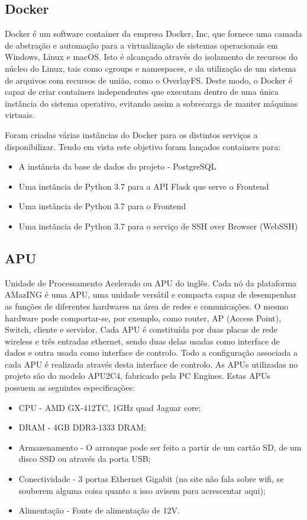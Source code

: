 \subsection{Docker}
Docker é um software container da empresa Docker, Inc, que fornece uma camada de abstração e automação para a virtualização de sistemas operacionais em Windows, Linux e macOS. Isto é alcançado através do isolamento de recursos do núcleo do Linux, tais como cgroups e namespaces, e da utilização de um sistema de arquivos com recursos de união, como o OverlayFS. Deste modo, o Docker é capaz de criar containers independentes que executam dentro de uma única instância do sistema operativo, evitando assim a sobrecarga de manter máquinas virtuais. 

Foram criadas várias instâncias do Docker para os distintos serviços a disponibilizar. Tendo em vista este objetivo foram lançados containers para:
\begin{itemize}
    \item A instância da base de dados do projeto - PostgreSQL
    \item Uma instância de Python 3.7 para a API Flask que serve o Frontend
    \item Uma instância de Python 3.7 para o Frontend
    \item Uma instância de Python 3.7 para o serviço de SSH over Browser (WebSSH)
\end{itemize}


\subsection{APU}
Unidade de Processamento Acelerado ou APU do inglês. Cada nó da plataforma AMazING é uma APU, uma unidade versátil e compacta capaz de desempenhar as funções de diferentes hardwares na área de redes e comunicações. O mesmo hardware pode comportar-se, por exemplo, como router, AP (Access Point), Switch, cliente e servidor.\newline
Cada APU é constituída por duas placas de rede wireless e três entradas ethernet, sendo duas delas usadas como interface de dados e outra usada como interface de controlo. Todo a configuração associada a cada APU é realizada através desta interface de controlo.\newline
As APUs utilizadas no projeto são do modelo APU2C4, fabricado pela PC Engines. Estas APUs possuem as seguintes especificações:
\begin{itemize}
    \item CPU - AMD GX-412TC, 1GHz quad Jaguar core;
    \item DRAM - 4GB DDR3-1333 DRAM;
    \item Armazenamento - O arranque pode ser feito a partir de um cartão SD, de um disco SSD ou através da porta USB;
    \item Conectividade - 3 portas Ethernet Gigabit (no site não fala sobre wifi, se souberem alguma coisa quanto a isso avisem para acrescentar aqui);
    \item Alimentação - Fonte de alimentação de 12V.
\end{itemize}

